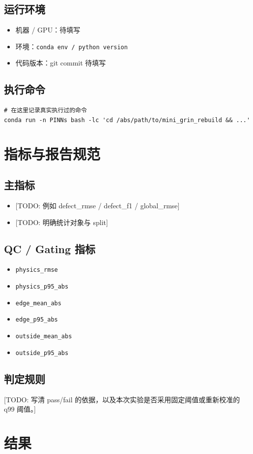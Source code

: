 \documentclass[UTF8,a4paper,11pt]{ctexart}
\newcommand{\HardwareSummary}{%
\begin{itemize}
  \item 机器 / GPU：待填写
  \item 环境：\texttt{conda env / python version}
  \item 代码版本：git commit 待填写
\end{itemize}
}
\newcommand{\TODO}[1]{\textcolor{red!70!black}{[TODO: #1]}}
\newcommand{\Code}[1]{\texttt{#1}}
\begin{document}
\subsection{运行环境}
\HardwareSummary

\subsection{执行命令}
\begin{verbatim}
# 在这里记录真实执行过的命令
conda run -n PINNs bash -lc 'cd /abs/path/to/mini_grin_rebuild && ...'
\end{verbatim}

\section{指标与报告规范}

\subsection{主指标}
\begin{itemize}
  \item \TODO{例如 defect\_rmse / defect\_f1 / global\_rmse}
  \item \TODO{明确统计对象与 split}
\end{itemize}

\subsection{QC / Gating 指标}
\begin{itemize}
  \item \Code{physics\_rmse}
  \item \Code{physics\_p95\_abs}
  \item \Code{edge\_mean\_abs}
  \item \Code{edge\_p95\_abs}
  \item \Code{outside\_mean\_abs}
  \item \Code{outside\_p95\_abs}
\end{itemize}

\subsection{判定规则}
\TODO{写清 pass/fail 的依据，以及本次实验是否采用固定阈值或重新校准的 q99 阈值。}

\section{结果}
\end{document}
